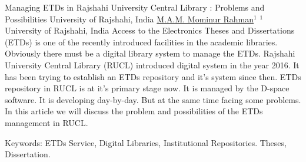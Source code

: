 
    \begin{abstract_online}{Managing ETDs in Rajshahi University Central Library : Problems and Possibilities University of Rajshahi, India}{%
        \underline{ M.A.M. Mominur Rahman}$^{1}$}{%
        }{%
        $^1$  University of Rajshahi, India\newline{}
            }
	Access to the Electronics Theses and Dissertations (ETDs) is one of the recently introduced facilities in the academic libraries. Obviously there must be a digital library system to manage the ETDs. Rajshahi University Central Library (RUCL) introduced digital system in the year 2016. It has been trying to establish an ETDs repository and it’s system since then.  ETDs repository in RUCL is at it’s primary stage now. It is managed by the D-space software. It is developing day-by-day. But at the same time facing some problems. In this article we will discuss the problem and possibilities of the ETDs management in RUCL.
      
      Keywords: ETDs Service, Digital Libraries, Institutional Repositories. Theses, Dissertation.
    \end{abstract_online}
    
